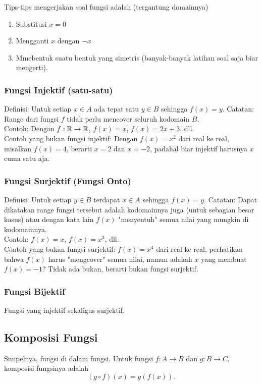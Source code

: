 Tips-tips mengerjakan soal fungsi adalah (tergantung domainnya)
\begin{enumerate}
\item Substitusi $x=0$
\item Mengganti $x$ dengan $-x$
\item Mmebentuk suatu bentuk yang simetris (banyak-banyak latihan soal saja biar mengerti).
\end{enumerate}

\subsubsection{Fungsi Injektif (satu-satu)}
Definisi: Untuk setiap $x \in A$ ada tepat satu $y \in B$ sehingga $f(x)=y$. 
Catatan: Range dari fungsi $f$ tidak perlu mencover seluruh kodomain $B$.\\
Contoh: Dengan $f: \mathbb R \rightarrow \mathbb R$, $f(x)=x$, $f(x)=2x+3$, dll.\\ 
Contoh yang bukan fungsi injektif: Dengan $f(x)=x^2$ dari real ke real, misalkan $f(x)=4$, berarti $x=2$ dan $x=-2$, padahal biar injektif harusnya $x$ cuma satu aja.

\subsubsection{Fungsi Surjektif (Fungsi Onto)}
Definisi: Untuk setiap $y \in B$ terdapat $x \in A$ sehingga $f(x)=y$. 
Catatan: Dapat dikatakan range fungsi tersebut adalah kodomainnya juga (untuk sebagian besar kasus) atau dengan kata lain $f(x)$ "menyentuh" semua nilai yang mungkin di kodomainnya. \\
Contoh: $f(x)=x$, $f(x)=x^3$, dll.\\
Contoh yang bukan fungsi surjektif: $f(x)=x^4$ dari real ke real, perhatikan bahwa $f(x)$ harus "mengcover" semua nilai, namun adakah $x$ yang membuat $f(x)=-1$? Tidak ada bukan, berarti bukan fungsi surjektif.

\subsubsection{Fungsi Bijektif}
Fungsi yang injektif sekaligus surjektif.

\subsection{Komposisi Fungsi}
Simpelnya, fungsi di dalam fungsi. Untuk fungsi $f:A \rightarrow B$ dan $g:B \rightarrow C$, komposisi fungsinya adalah
$$(g \circ f)(x) = g(f(x)).$$

